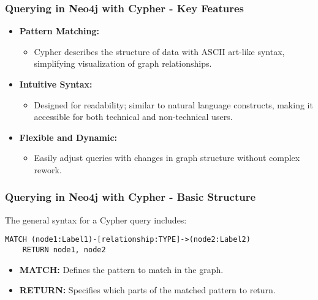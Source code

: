 \documentclass[aspectratio=169]{beamer}
\begin{document}
\begin{frame}[fragile]
    \frametitle{Querying in Neo4j with Cypher - Key Features}
    \begin{itemize}
        \item \textbf{Pattern Matching:} 
            \begin{itemize}
                \item Cypher describes the structure of data with ASCII art-like syntax, simplifying visualization of graph relationships.
            \end{itemize}
        
        \item \textbf{Intuitive Syntax:} 
            \begin{itemize}
                \item Designed for readability; similar to natural language constructs, making it accessible for both technical and non-technical users.
            \end{itemize}
        
        \item \textbf{Flexible and Dynamic:}
            \begin{itemize}
                \item Easily adjust queries with changes in graph structure without complex rework.
            \end{itemize}
    \end{itemize}
\end{frame}

\begin{frame}[fragile]
    \frametitle{Querying in Neo4j with Cypher - Basic Structure}
    The general syntax for a Cypher query includes:
    
    \begin{lstlisting}[language=cypher]
    MATCH (node1:Label1)-[relationship:TYPE]->(node2:Label2)
    RETURN node1, node2
    \end{lstlisting}

    \begin{itemize}
        \item \textbf{MATCH:} Defines the pattern to match in the graph.
        \item \textbf{RETURN:} Specifies which parts of the matched pattern to return.
    \end{itemize}
\end{frame}
\end{document}
